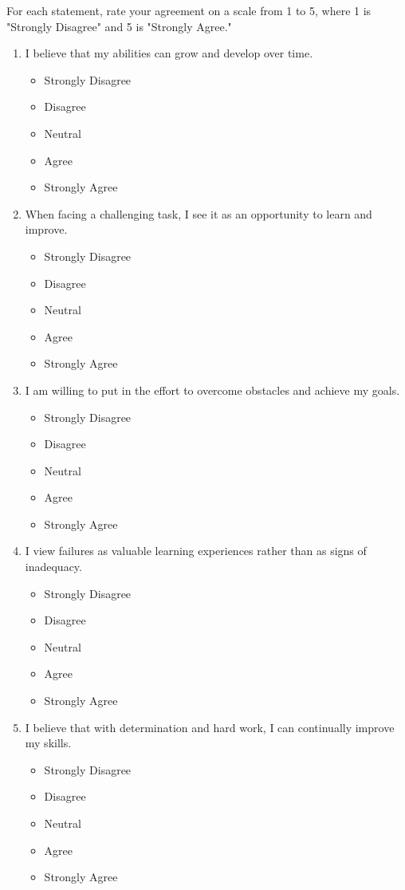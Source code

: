 \documentclass[14pt, letterpaper, twoside]{article}
\begin{document}
For each statement, rate your agreement on a scale from 1 to 5, where 1 is "Strongly
Disagree" and 5 is "Strongly Agree."
	\begin{enumerate}
	\item I believe that my abilities can grow and develop over time.
		\begin{itemize}
		\item Strongly Disagree
		\item Disagree
		\item Neutral
		\item Agree
		\item Strongly Agree
		\end{itemize}
    \item When facing a challenging task, I see it as an opportunity to learn and improve.
    		\begin{itemize}
		\item Strongly Disagree
		\item Disagree
		\item Neutral
		\item Agree
		\item Strongly Agree
		\end{itemize}
	\item I am willing to put in the effort to overcome obstacles and achieve my goals.
		\begin{itemize}
		\item Strongly Disagree
		\item Disagree
		\item Neutral
		\item Agree
		\item Strongly Agree
		\end{itemize}
	\item I view failures as valuable learning experiences rather than as signs of
	inadequacy.
		\begin{itemize}
		\item Strongly Disagree
		\item Disagree
		\item Neutral
		\item Agree
		\item Strongly Agree
		\end{itemize}
	\item I believe that with determination and hard work, I can continually improve my
	skills.
		\begin{itemize}
		\item Strongly Disagree
		\item Disagree
		\item Neutral
		\item Agree
		\item Strongly Agree
		\end{itemize}
	\end{enumerate}
\end{document}
